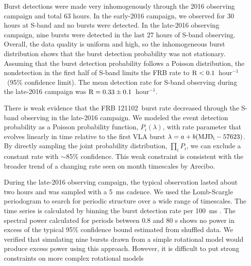 \documentclass[twocolumn]{aastex61}
\newcommand{\frb}{FRB 121102}
\begin{document}
Burst detections were made very inhomogenously through the 2016 observing campaign and total 63 hours. In the early-2016 campaign, we observed for 30 hours at S-band and no bursts were detected. In the late-2016 observing campaign, nine bursts were detected in the last 27 hours of S-band observing. Overall, the data quality is uniform and high, so the inhomogeneous burst distribution shows that the burst detection probability was not stationary. Assuming that the burst detection probability follows a Poisson distribution, the nondetection in the first half of S-band limits the FRB rate to $\rm{R}<0.1$\ hour$^{-1}$\ (95\% confidence limit). The mean detection rate for S-band observing during the late-2016 campaign was $\rm{R}=0.33\pm0.1$\ hour$^{-1}$.

There is weak evidence that the \frb\ burst rate decreased through the S-band observing in the late-2016 campaign. We modeled the event detection probability as a Poisson probability function, $P_i(\lambda)$, with rate parameter that evolves linearly in time relative to the first VLA burst $\lambda = a + b (\rm{MJD}_i - 57623)$. By directly sampling the joint probability distribution, $\prod_{i} P_i$, we can exclude a constant rate with $\sim$85\% confidence. This weak constraint is consistent with the broader trend of a changing rate seen on month timescales by Arecibo.


During the late-2016 observing campaign, the typical observation lasted about two hours and was sampled with a 5~ms cadence. We used the Lomb-Scargle periodogram \citep{1982ApJ...263..835S} to search for periodic structure over a wide range of timescales. The time series is calculated by binning the burst detection rate per 100~ms \citep[always either 0 or 1, see also][]{2011MNRAS.417.1871P}. 
The spectral power calculated for periods between 0.8 and 80 s shows no power in excess of the typical 95\% confidence bound estimated from shuffled data. We verified that simulating nine bursts drawn from a simple rotational model would produce excess power using this approach. However, it is difficult to put strong constraints on more complex rotational models \citep[e.g., with wide pulse phase windows or glitches;][]{2007ApJ...663..497C, 2013Natur.497..591A}
\end{document}
